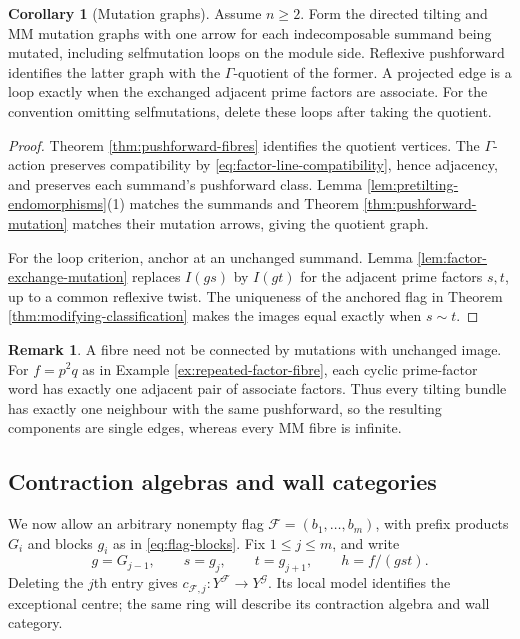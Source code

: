 \documentclass[a4paper,reqno]{amsart}
\def\F{\mathcal{F}}
\theoremstyle{definition}
\newtheorem{Cor}[Thm]{Corollary}
\newtheorem{Rem}[Thm]{Remark}
\begin{document}
\begin{Cor}[Mutation graphs]\label{cor:mm-mutation-graph}
Assume $n\ge2$. Form the directed tilting and MM mutation graphs with one arrow for each indecomposable summand being mutated, including selfmutation loops on the module side. Reflexive pushforward identifies the latter graph with the $\Gamma$-quotient of the former. A projected edge is a loop exactly when the exchanged adjacent prime factors are associate. For the convention omitting selfmutations, delete these loops after taking the quotient.
\end{Cor}
\begin{proof}
Theorem \ref{thm:pushforward-fibres} identifies the quotient vertices. The $\Gamma$-action preserves compatibility by \eqref{eq:factor-line-compatibility}, hence adjacency, and preserves each summand's pushforward class. Lemma \ref{lem:pretilting-endomorphisms}(1) matches the summands and Theorem \ref{thm:pushforward-mutation} matches their mutation arrows, giving the quotient graph.

For the loop criterion, anchor at an unchanged summand. Lemma \ref{lem:factor-exchange-mutation} replaces $I(gs)$ by $I(gt)$ for the adjacent prime factors $s,t$, up to a common reflexive twist. The uniqueness of the anchored flag in Theorem \ref{thm:modifying-classification} makes the images equal exactly when $s\sim t$.
\end{proof}

\begin{Rem}\label{rem:fibre-gallery-disconnected}
A fibre need not be connected by mutations with unchanged image. For $f=p^2q$ as in Example \ref{ex:repeated-factor-fibre}, each cyclic prime-factor word has exactly one adjacent pair of associate factors. Thus every tilting bundle has exactly one neighbour with the same pushforward, so the resulting components are single edges, whereas every MM fibre is infinite.
\end{Rem}

\subsection{Contraction algebras and wall categories}\label{sec:elementary-contractions}

We now allow an arbitrary nonempty flag $\F=(b_1,\ldots,b_m)$, with prefix products $G_i$ and blocks $g_i$ as in \eqref{eq:flag-blocks}. Fix $1\le j\le m$, and write
\[
g=G_{j-1},\qquad s=g_j,\qquad t=g_{j+1},\qquad h=f/(gst).
\]
Deleting the $j$th entry gives $c_{\F,j}\colon Y^\F\to Y^{\mathcal G}$. Its local model identifies the exceptional centre; the same ring will describe its contraction algebra and wall category.
\end{document}
